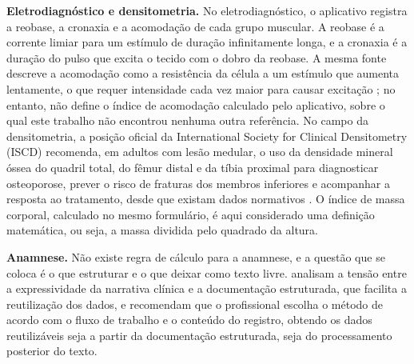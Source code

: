 \textbf{Eletrodiagnóstico e densitometria.} No eletrodiagnóstico, o aplicativo registra a reobase, a cronaxia e a
acomodação de cada grupo muscular. A reobase é a corrente limiar para um estímulo de duração infinitamente longa, e a
cronaxia é a duração do pulso que excita o tecido com o dobro da reobase. A mesma fonte descreve a acomodação como a
resistência da célula a um estímulo que aumenta lentamente, o que requer intensidade cada vez maior para causar
excitação \cite[p.~176,~178]{geddes2004chronaxie}; no entanto, não define o índice de acomodação calculado pelo
aplicativo, sobre o qual este trabalho não encontrou nenhuma outra referência. No campo da densitometria, a posição
oficial da International Society for Clinical Densitometry (ISCD) recomenda, em adultos com lesão medular, o uso da
densidade mineral óssea do quadril total, do fêmur distal e da tíbia proximal para diagnosticar osteoporose, prever o
risco de fraturas dos membros inferiores e acompanhar a resposta ao tratamento, desde que existam dados normativos
\cite{morse2019bone}. O índice de massa corporal, calculado no mesmo formulário, é aqui considerado uma definição
matemática, ou seja, a massa dividida pelo quadrado da altura.

\textbf{Anamnese.} Não existe regra de cálculo para a anamnese, e a questão que se coloca é o que estruturar e o que
deixar como texto livre.  analisam a tensão entre a expressividade da
narrativa clínica e a documentação estruturada, que facilita a reutilização dos dados, e recomendam que o
profissional escolha o método de acordo com o fluxo de trabalho e o conteúdo do registro, obtendo os dados
reutilizáveis seja a partir da documentação estruturada, seja do processamento posterior do texto.

